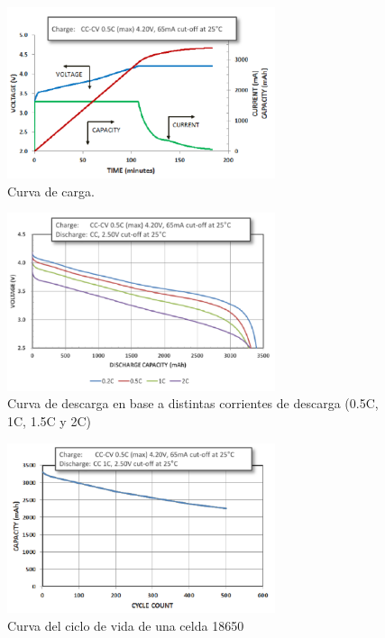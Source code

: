 \documentclass[10pt,a4paper]{article}
\begin{document}
\begin{figure}[h!]
	\begin{center}
	\includegraphics[width=0.7\textwidth]{cc_cv_18650.png}
	\caption{Curva de carga.}
	\label{cc_cv}
	\end{center}
\end{figure}

\begin{figure}[h!]
	\begin{center}
	\includegraphics[width=0.7\textwidth]{discharge_18650.png}
	\caption{Curva de descarga en base a distintas corrientes de descarga (0.5C, 1C, 1.5C y 2C)}
	\label{descarga_18650}
	\end{center}
\end{figure}

\begin{figure}[h!]
	\begin{center}
	\includegraphics[width=0.7\textwidth]{life_cycle_18650.png}
	\caption{Curva del ciclo de vida de una celda 18650}
	\label{life_cycle_18650}
	\end{center}
\end{figure}
\end{document}
